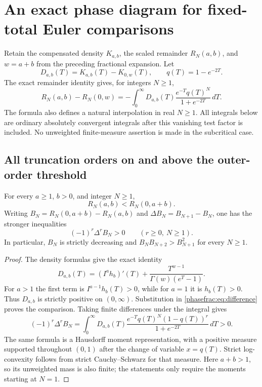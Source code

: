 
\section{An exact phase diagram for fixed-total Euler comparisons}
\label{phasefrac:sec:main}

Retain the compensated density $K_{a,b}$, the scaled remainder $R_N(a,b)$,
and $w=a+b$ from the preceding fractional expansion. Let
\[
 D_{a,b}(T)=K_{a,b}(T)-K_{0,w}(T),\qquad
 q(T)=1-e^{-2T}.
\]
The exact remainder identity gives, for integers $N\ge1$,
\begin{equation}\label{phasefrac:eq:difference}
 R_N(a,b)-R_N(0,w)
 =-\int_0^\infty
 D_{a,b}(T)\frac{e^{-T}q(T)^N}{1+e^{-2T}}\,dT.
\end{equation}
The formula also defines a natural interpolation in real $N\ge1$.
All integrals below are ordinary absolutely convergent integrals after
this vanishing test factor is included. No unweighted finite-measure
assertion is made in the subcritical case.

\subsection{All truncation orders on and above the outer-order threshold}

\begin{theorem}
\label{phasefrac:thm:above}
For every $a\ge1$, $b>0$, and integer $N\ge1$,
\[
 R_N(a,b)<R_N(0,a+b).
\]
Writing $B_N=R_N(0,a+b)-R_N(a,b)$ and
$\Delta B_N=B_{N+1}-B_N$, one has the stronger inequalities
\[
 (-1)^r\Delta^rB_N>0\qquad(r\ge0,\ N\ge1).
\]
In particular, $B_N$ is strictly decreasing and
$B_NB_{N+2}>B_{N+1}^2$ for every $N\ge1$.
\end{theorem}
\begin{proof}
The density formulas give the exact identity
\begin{equation}\label{phasefrac:eq:positive-density}
 D_{a,b}(T)=(I^a h_b)'(T)
    +\frac{T^{w-1}}{\Gamma(w)(e^T-1)}.
\end{equation}
For $a>1$ the first term is $I^{a-1}h_b(T)>0$, while for $a=1$
it is $h_b(T)>0$. Thus $D_{a,b}$ is strictly positive on $(0,\infty)$.
Substitution in \eqref{phasefrac:eq:difference} proves the comparison.
Taking finite differences under the integral gives
\[
 (-1)^r\Delta^rB_N
 =\int_0^\infty D_{a,b}(T)
   \frac{e^{-T}q(T)^N(1-q(T))^r}{1+e^{-2T}}\,dT>0.
\]
The same formula is a Hausdorff moment representation, with a positive
measure supported throughout $(0,1)$ after the change of variable $x=q(T)$.
Strict log-convexity follows from strict Cauchy--Schwarz for that measure.
Here $a+b>1$, so its unweighted mass is also finite; the statements
only require the moments starting at $N=1$.
\end{proof}

